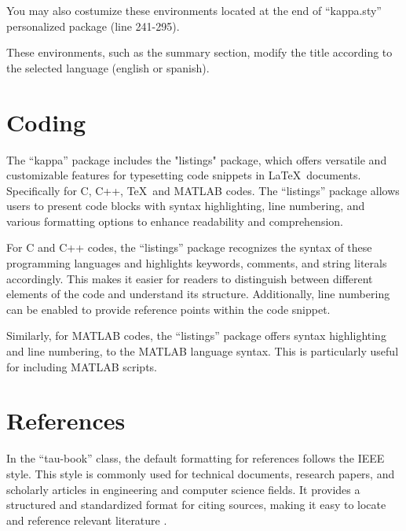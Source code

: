 \documentclass[10pt,a4paper,twoside]{tau-book}
\begin{document}
        You may also costumize these environments located at the end of ``kappa.sty'' personalized package (line 241-295).

        \begin{note}
            These environments, such as the summary section, modify the title according to the selected language (english or spanish).
        \end{note}

\section{Coding}

    The ``kappa'' package includes the "listings" package, which offers versatile and customizable features for typesetting code snippets in \LaTeX\ documents. Specifically for C, C++, \TeX\ and MATLAB codes. The ``listings'' package allows users to present code blocks with syntax highlighting, line numbering, and various formatting options to enhance readability and comprehension.

    For C and C++ codes, the ``listings'' package recognizes the syntax of these programming languages and highlights keywords, comments, and string literals accordingly. This makes it easier for readers to distinguish between different elements of the code and understand its structure. Additionally, line numbering can be enabled to provide reference points within the code snippet.

    

    Similarly, for MATLAB codes, the ``listings'' package offers syntax highlighting and line numbering, to the MATLAB language syntax. This is particularly useful for including MATLAB scripts.
    
    

\section{References}

    In the ``tau-book'' class, the default formatting for references follows the IEEE style. This style is commonly used for technical documents, research papers, and scholarly articles in engineering and computer science fields. It provides a structured and standardized format for citing sources, making it easy to locate and reference relevant literature \cite{einstein}.
\end{document}
